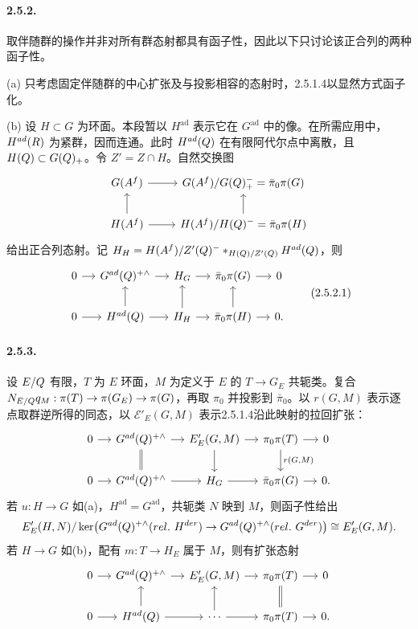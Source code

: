\paragraph*{2.5.2.} 取伴随群的操作并非对所有群态射都具有函子性，因此以下只讨论该正合列的两种函子性。

(a) 只考虑固定伴随群的中心扩张及与投影相容的态射时，2.5.1.4以显然方式函子化。

(b) 设 $H\subset G$ 为环面。本段暂以 $H^{\mathrm{ad}}$ 表示它在 $G^{\mathrm{ad}}$ 中的像。在所需应用中，$H^{ad}(R)$ 为紧群，因而连通。此时 $H^{ad}(Q)$ 在有限阿代尔点中离散，且 $H(Q)\subset G(Q)_+$。令 $Z'=Z\cap H$。自然交换图
\[
 \begin{tikzcd}
 G(A^f)\arrow[r]&G(A^f)/G(\Q)_+^-=\bar\pi_0\pi(G)\\
 H(A^f)\arrow[r]\arrow[u]&H(A^f)/H(\Q)^-=\bar\pi_0\pi(H)\arrow[u]
 \end{tikzcd}
\]
给出正合列态射。记 $H_H=H(A^f)/Z'(Q)^-*_{H(Q)/Z'(Q)}H^{ad}(Q)$，则
\begin{equation}
 \begin{tikzcd}[column sep=small]
 0\arrow[r]&G^{\mathrm{ad}}(\Q)^{+\wedge}\arrow[r]&\mathcal H_G\arrow[r]&\bar\pi_0\pi(G)\arrow[r]&0\\
 0\arrow[r]&H^{\mathrm{ad}}(\Q)\arrow[r]\arrow[u]&\mathcal H_H\arrow[r]\arrow[u]&\bar\pi_0\pi(H)\arrow[r]\arrow[u]&0.
 \end{tikzcd}
 \tag{2.5.2.1}
\end{equation}
\paragraph*{2.5.3.} 设 $E/Q$ 有限，$T$ 为 $E$ 环面，$M$ 为定义于 $E$ 的 $T\to G_E$ 共轭类。复合 $N_{E/Q}q_M:\pi(T)\to\pi(G_E)\to\pi(G)$，再取 $\pi_0$ 并投影到 $\bar\pi_0$。以 $r(G,M)$ 表示逐点取群逆所得的同态，以 $\mathcal E'_E(G,M)$ 表示2.5.1.4沿此映射的拉回扩张：
\[
 \begin{tikzcd}[column sep=small]
 0\arrow[r]&G^{\mathrm{ad}}(\Q)^{+\wedge}\arrow[r]\arrow[d,equal]&\mathcal E'_E(G,M)\arrow[r]\arrow[d]&\pi_0\pi(T)\arrow[r]\arrow[d,"{r(G,M)}"]&0\\
 0\arrow[r]&G^{\mathrm{ad}}(\Q)^{+\wedge}\arrow[r]&\mathcal H_G\arrow[r]&\bar\pi_0\pi(G)\arrow[r]&0.
 \end{tikzcd}
\]
若 $u:H\to G$ 如(a)，$H^{\mathrm{ad}}=G^{\mathrm{ad}}$，共轭类 $N$ 映到 $M$，则函子性给出
\[
 \mathcal E'_E(H,N)/\ker\bigl(G^{\mathrm{ad}}(\Q)^{+\wedge}(\mathrm{rel.}\ H^{\mathrm{der}})
 \to G^{\mathrm{ad}}(\Q)^{+\wedge}(\mathrm{rel.}\ G^{\mathrm{der}})\bigr)
 \cong\mathcal E'_E(G,M).
\]
若 $H\to G$ 如(b)，配有 $m:T\to H_E$ 属于 $M$，则有扩张态射
\[
 \begin{tikzcd}[column sep=small]
 0\arrow[r]&G^{\mathrm{ad}}(\Q)^{+\wedge}\arrow[r]&\mathcal E'_E(G,M)\arrow[r]&\pi_0\pi(T)\arrow[r]&0\\
 0\arrow[r]&H^{\mathrm{ad}}(\Q)\arrow[r]\arrow[u]&\cdots\arrow[r]\arrow[u]&\pi_0\pi(T)\arrow[r]\arrow[u,equal]&0.
 \end{tikzcd}
\]
